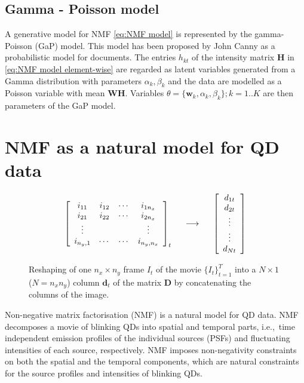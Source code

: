 \subsection{Gamma - Poisson model \label{sub:GaP}}
A generative model for NMF \autoref{eq:NMF model} is represented by the gamma-Poisson (GaP) model. This model has been proposed by John Canny \cite{Canny2004} as a probabilistic model for documents. The entries $h_{kt}$ of the intensity matrix $\bm{H}$ in \autoref{eq:NMF model element-wise} are regarded as latent variables generated from a Gamma distribution with parameters $\alpha_k, \beta_k$ and the data are modelled as a Poisson variable with mean $\bm{WH}$. Variables $\theta = \{\bm{w}_k,\alpha_k, \beta_k\}; k = 1..K$ are then parameters of the GaP model.
\afterpage{\clearpage}

\section{NMF as a natural model for QD data\label{sec: NMF QD}}
%
\begin{figure}[!hbt]
	\begin{equation}
		\left[
		\begin{array}{ccccc}
		i_{11} & i_{12}  & \cdots & i_{1n_x}\\
		i_{21} & i_{22}  & \cdots & i_{2n_x}\\
		\vdots & & & \vdots\\
		i_{n_y,1} & \cdots & \cdots & i_{n_y,n_x}
		\end{array}	
		\right]_t
		\hspace{.5cm}
		\longrightarrow
		\hspace{.5cm}
		\left[
		\begin{array}{c}	
		d_{1t}\\	d_{2t}\\	\vdots\\ \vdots\\ d_{Nt}
		\end{array}
		\right]\nonumber
	\end{equation}
	\caption{Reshaping of one $n_x \times n_y$ frame $I_t$ of the movie $\{I_t\}_{t=1}^T$ into a $N\times 1$ ($N=n_x n_y$) column $\bm{d}_t$ of the matrix $\bm{D}$ by concatenating the columns of the image.}
	\label{fig:reshape image}
\end{figure}

Non-negative matrix factorisation (NMF) \cite{Lee1999,Lee2001} is a natural model for QD data. NMF decomposes a movie of blinking QDs into spatial and temporal parts, i.e.,\ time independent emission profiles of the individual sources (PSFs) and fluctuating intensities of each source, respectively. NMF imposes non-negativity constraints on both the spatial and the temporal components, which are natural constraints for the source profiles and intensities of blinking QDs.

